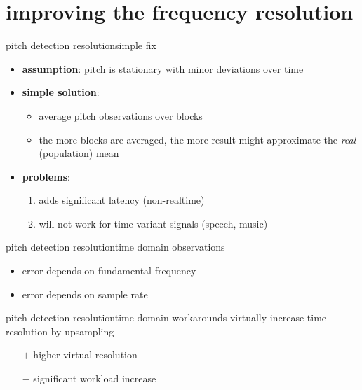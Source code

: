     \section[solutions]{improving the frequency resolution}
        \begin{frame}{pitch detection resolution}{simple fix}
            \begin{itemize}
                \item   \textbf{assumption}: pitch is stationary with minor deviations over time
                \bigskip
                \item<2-> \textbf{simple solution}: 
                    \begin{itemize}
                        \item   average pitch observations over blocks
                        \item   the more blocks are averaged, the more result might approximate the \textit{real} (population) mean
                    \end{itemize}
                \bigskip
                \item<3->   \textbf{problems}:
                    \begin{enumerate}
                        \item   adds significant latency (non-realtime)
                        \item   will not work for time-variant signals (speech, music)
                    \end{enumerate}
            \end{itemize}
        \end{frame}
    
        \begin{frame}{pitch detection resolution}{time domain observations}
            
            \begin{itemize}
                \item   error depends on fundamental frequency
                \item   error depends on sample rate
            \end{itemize}
        \end{frame}
        \begin{frame}{pitch detection resolution}{time domain workarounds}
            \vspace{-2mm}
            virtually increase time resolution by upsampling
            
            \begin{enumerate}
                \item[$+$] higher virtual resolution
                \item[$-$] significant workload increase
            \end{enumerate}
        \end{frame}
	
